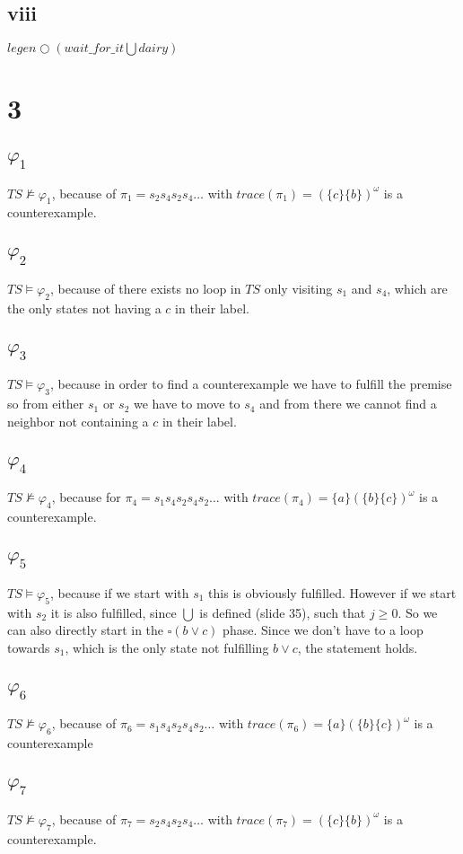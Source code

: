 \documentclass[11pt]{article}
\begin{document}
	\subsection{viii}
	$ legen\bigcirc (wait\_for\_it \bigcup dairy) $%
	
	
	\section{3}
	\subsection{$\varphi_1$}
	$TS \not\models \varphi_1$, because of $\pi_1 = s_2s_4s_2s_4\dots$ with $trace(\pi_1)=(\{c\}\{b\})^\omega$ is a counterexample.
	\subsection{$\varphi_2$}
	$TS \models \varphi_2$, because of there exists no loop in $TS$ only visiting $s_1$ and $s_4$, which are the only states not having a $c$ in their label.
	\subsection{$\varphi_3$}
	$TS \models \varphi_3$, because in order to find a counterexample we have to fulfill the premise so from either $s_1$ or $s_2$ we have to move to $s_4$ and from there we cannot find a neighbor not containing a $c$ in their label.
	\subsection{$\varphi_4$}
	$TS \not\models \varphi_4$, because for $\pi_4 = s_1s_4s_2s_4s_2\dots$ with $trace(\pi_4)= \{a\}(\{b\}\{c\})^\omega$ is a counterexample.
	\subsection{$\varphi_5$}
	$TS \models \varphi_5$, because if we start with $s_1$ this is obviously fulfilled. However if we start with $s_2$ it is also fulfilled, since $\bigcup$ is defined (slide 35), such that $j \ge 0$. So we can also directly start in the $\square(b\lor c)$ phase. Since we don't have to a loop towards $s_1$, which is the only state not fulfilling $b \lor c$, the statement holds.
	\subsection{$\varphi_6$}
	$TS \not\models \varphi_6$, because of $\pi_6 = s_1 s_4 s_2 s_4 s_2\dots$ with $trace(\pi_6)= \{a\}(\{b\}\{c\})^\omega$ is a counterexample
	\subsection{$\varphi_7$}
	$TS \not\models \varphi_7$, because of $\pi_7 = s_2s_4s_2s_4\dots$ with $trace(\pi_7)= (\{c\}\{b\})^\omega$ is a counterexample.
\end{document}
